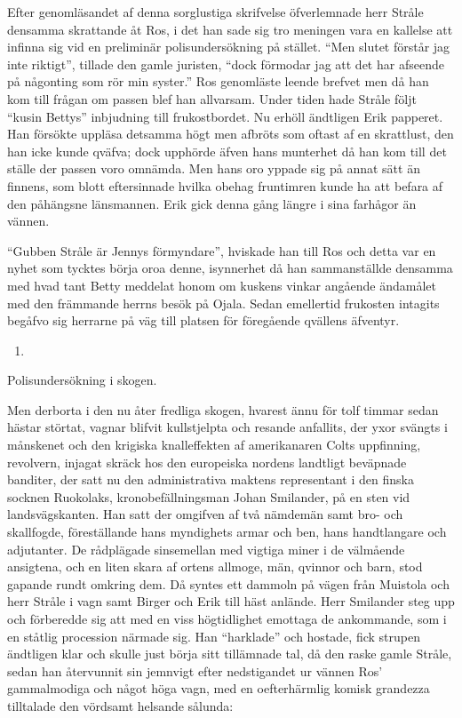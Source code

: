 Efter genomläsandet af denna sorglustiga skrifvelse öfverlemnade herr
Stråle densamma skrattande åt Ros, i det han sade sig tro meningen vara
en kallelse att infinna sig vid en preliminär polisundersökning på
stället. ``Men slutet förstår jag inte riktigt'', tillade den gamle
juristen, ``dock förmodar jag att det har afseende på någonting som rör
min syster.'' Ros genomläste leende brefvet men då han kom till frågan
om passen blef han allvarsam. Under tiden hade Stråle följt ``kusin
Bettys'' inbjudning till frukostbordet. Nu erhöll ändtligen Erik
papperet. Han försökte uppläsa detsamma högt men afbröts som oftast af
en skrattlust, den han icke kunde qväfva; dock upphörde äfven hans
munterhet då han kom till det ställe der passen voro omnämda. Men hans
oro yppade sig på annat sätt än finnens, som blott eftersinnade hvilka
obehag fruntimren kunde ha att befara af den påhängsne länsmannen. Erik
gick denna gång längre i sina farhågor än vännen.

``Gubben Stråle är Jennys förmyndare'', hviskade han till Ros och detta
var en nyhet som tycktes börja oroa denne, isynnerhet då han
sammanställde densamma med hvad tant Betty meddelat honom om kuskens
vinkar angående ändamålet med den främmande herrns besök på Ojala. Sedan
emellertid frukosten intagits begåfvo sig herrarne på väg till platsen
för föregående qvällens äfventyr.

\begin{enumerate}
\def\labelenumi{\arabic{enumi}.}
\setcounter{enumi}{22}
\tightlist
\item
\end{enumerate}

Polisundersökning i skogen.

Men derborta i den nu åter fredliga skogen, hvarest ännu för tolf timmar
sedan hästar störtat, vagnar blifvit kullstjelpta och resande anfallits,
der yxor svängts i månskenet och den krigiska knalleffekten af
amerikanaren Colts uppfinning, revolvern, injagat skräck hos den
europeiska nordens landtligt beväpnade banditer, der satt nu den
administrativa maktens representant i den finska socknen Ruokolaks,
kronobefällningsman Johan Smilander, på en sten vid landsvägskanten. Han
satt der omgifven af två nämdemän samt bro- och skallfogde,
föreställande hans myndighets armar och ben, hans handtlangare och
adjutanter. De rådplägade sinsemellan med vigtiga miner i de välmående
ansigtena, och en liten skara af ortens allmoge, män, qvinnor och barn,
stod gapande rundt omkring dem. Då syntes ett dammoln på vägen från
Muistola och herr Stråle i vagn samt Birger och Erik till häst anlände.
Herr Smilander steg upp och förberedde sig att med en viss högtidlighet
emottaga de ankommande, som i en ståtlig procession närmade sig. Han
``harklade'' och hostade, fick strupen ändtligen klar och skulle just
börja sitt tillämnade tal, då den raske gamle Stråle, sedan han
återvunnit sin jemnvigt efter nedstigandet ur vännen Ros' gammalmodiga
och något höga vagn, med en oefterhärmlig komisk grandezza tilltalade
den vördsamt helsande sålunda:

